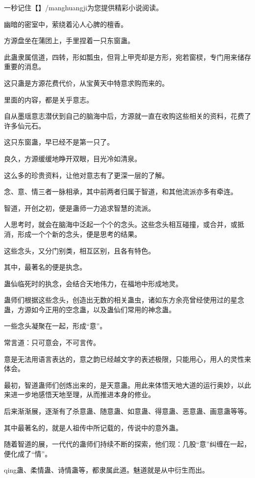 
\begin{this_body}

一秒记住【】/manghuangji为您提供精彩小说阅读。

幽暗的密室中，萦绕着沁人心脾的檀香。

方源盘坐在蒲团上，手里捏着一只东窗蛊。

此蛊隶属信道，四转，形如瓢虫，但背上甲壳却是方形，宛若窗棂，专门用来储存重要的消息。

这只蛊是方源花费代价，从宝黄天中特意求购而来的。

里面的内容，都是关乎意志。

自从墨瑶意志潜伏到自己的脑海中后，方源就一直在收购这些相关的资料，花费了许多仙元石。

这只东窗蛊，早已经不是第一只了。

良久，方源缓缓地睁开双眼，目光冷如清泉。

这么多的珍贵资料，让他对意志有了更深一层的了解。

念、意、情三者一脉相承，其中前两者归属于智道，和其他流派亦多有牵连。

智道，开创之初，便是蛊师一力追求智慧的流派。

人思考时，就会在脑海中泛起一个个的念头。这些念头相互碰撞，或合并，或抵消，形成一个个新的念头，便是思考的结果。

这些念头，又分门别类，相互区别，且各有特色。

其中，最著名的便是执念。

蛊仙临死时的执念，会结合天地伟力，在福地中形成地灵。

蛊师们根据这些念头，创造出无数的相关蛊虫，诸如东方余亮曾经使用过的星念蛊，方源如今正用的空念蛊，以及蛊仙们常用的神念蛊。

一些念头凝聚在一起，形成“意”。

常言道：只可意会，不可言传。

意是无法用语言表达的，意之韵已经越文字的表述极限，只能用心，用人的灵性来体会。

最初，智道蛊师们创炼出来的，是天意蛊。用此来体悟天地大道的运行奥妙，以此来进一步地感悟天地至理，从而推进本身的修业。

后来渐渐展，逐渐有了杀意蛊、随意蛊、如意蛊、得意蛊、恶意蛊、画意蛊等等。

其中最著名的，就是人祖传中所记载的，传说中的意外蛊。

随着智道的展，一代代的蛊师们持续不断的探索，他们现：几股“意”纠缠在一起，便化成了“情”。

qing蛊、柔情蛊、诗情蛊等，都隶属此道。魅道就是从中衍生而出。


\end{this_body}
